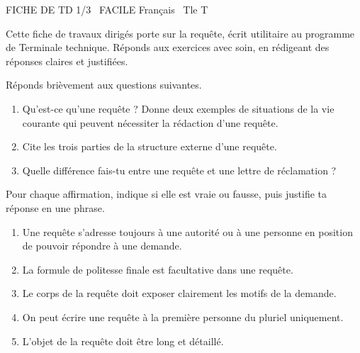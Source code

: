 \documentclass[11pt]{article}
\begin{document}
\begin{tcolorbox}[enhanced,colback=popink,colframe=popink,arc=10pt,boxrule=0pt,left=12pt,right=12pt,top=9pt,bottom=9pt]
{\color{white}\popxbold\small FICHE DE TD 1/3 \textbullet\ FACILE \hfill Français \textbullet\ Tle T\par}
\end{tcolorbox}
\vspace{4pt}
Cette fiche de travaux dirigés porte sur la requête, écrit utilitaire au programme de Terminale technique. Réponds aux exercices avec soin, en rédigeant des réponses claires et justifiées.

\begin{exercice}
Réponds brièvement aux questions suivantes.
\begin{enumerate}
\item Qu'est-ce qu'une requête ? Donne deux exemples de situations de la vie courante qui peuvent nécessiter la rédaction d'une requête.
\item Cite les trois parties de la structure externe d'une requête.
\item Quelle différence fais-tu entre une requête et une lettre de réclamation ?
\end{enumerate}
\end{exercice}

\begin{exercice}
Pour chaque affirmation, indique si elle est vraie ou fausse, puis justifie ta réponse en une phrase.
\begin{enumerate}
\item Une requête s'adresse toujours à une autorité ou à une personne en position de pouvoir répondre à une demande.
\item La formule de politesse finale est facultative dans une requête.
\item Le corps de la requête doit exposer clairement les motifs de la demande.
\item On peut écrire une requête à la première personne du pluriel uniquement.
\item L'objet de la requête doit être long et détaillé.
\end{enumerate}
\end{exercice}
\end{document}
